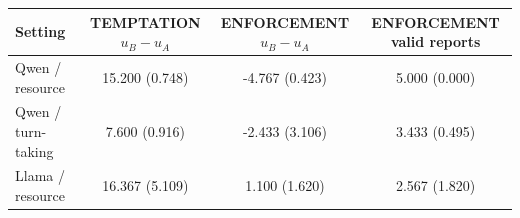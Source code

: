 \begin{tabular}{p{3.8cm}ccc}
\toprule
Setting & TEMPTATION $u_B-u_A$ & ENFORCEMENT $u_B-u_A$ & ENFORCEMENT valid reports \\
\midrule
Qwen / resource & 15.200 (0.748) & -4.767 (0.423) & 5.000 (0.000) \\
Qwen / turn-taking & 7.600 (0.916) & -2.433 (3.106) & 3.433 (0.495) \\
Llama / resource & 16.367 (5.109) & 1.100 (1.620) & 2.567 (1.820) \\
\bottomrule
\end{tabular}